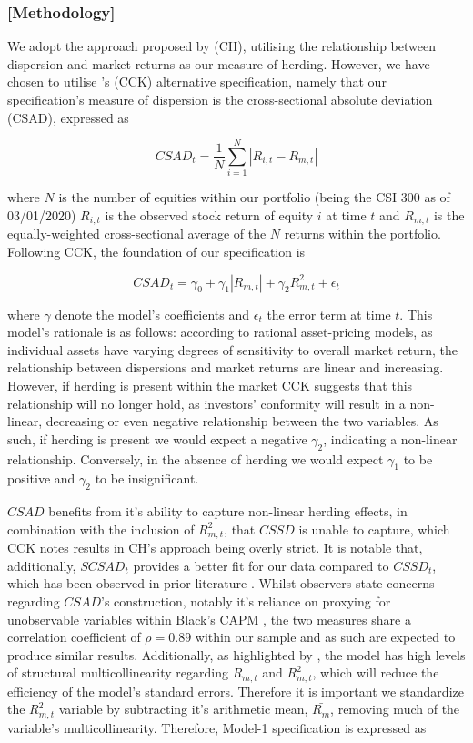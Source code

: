\documentclass[12pt]{article}
\numberwithin{table}{section}   %
\begin{document}
\subsubsection*{[Methodology]}

We adopt the approach proposed by \citet{ch} (CH), utilising the relationship between dispersion and market returns as our measure of herding. However, we have chosen to utilise \citet{cck}'s (CCK) alternative specification, namely that our specification’s measure of dispersion is the cross-sectional absolute deviation (CSAD), expressed as

$$
CSAD_t=\frac{1}{N}\sum^N_{i=1}|R_{i,t}-R_{m,t}|
$$

where $N$ is the number of equities within our portfolio (being the CSI 300 as of 03/01/2020) $R_{i,t}$ is the observed stock return of equity $i$ at time $t$ and $R_{m,t}$ is the equally-weighted cross-sectional average of the $N$ returns within the portfolio. Following CCK, the foundation of our specification is

$$
CSAD_t=\gamma_0+\gamma_1 |R_{m,t}|+\gamma_2 R_{m,t}^2+\epsilon_t
$$

where $\gamma$ denote the model’s coefficients and $\epsilon_t$ the error term at time $t$. This model’s rationale is as follows: according to rational asset-pricing models, as individual assets have varying degrees of sensitivity to overall market return, the relationship between dispersions and market returns are linear and increasing. However, if herding is present within the market CCK suggests that this relationship will no longer hold, as investors’ conformity will result in a non-linear, decreasing or even negative relationship between the two variables. As such, if herding is present we would expect a negative $\gamma_2$, indicating a non-linear relationship. Conversely, in the absence of herding we would expect $\gamma_1$ to be positive and $\gamma_2$ to be insignificant.

$CSAD$ benefits from it’s ability to capture non-linear herding effects, in combination with the inclusion of $R_{m,t}^2$, that $CSSD$ is unable to capture, which CCK notes results in CH’s approach being overly strict. It is notable that, additionally, $SCSAD_t$ provides a better fit for our data compared to $CSSD_t$, which has been observed in prior literature \citep{gleason}. Whilst observers state concerns regarding $CSAD$’s construction, notably it’s reliance on proxying for unobservable variables within Black’s CAPM \citep{yao, tan}, the two measures share a correlation coefficient of $\rho=0.89$ within our sample and as such are expected to produce similar results. Additionally, as highlighted by \citet{yao}, the model has high levels of structural multicollinearity regarding $R_{m,t}$ and $R_{m,t}^2$, which will reduce the efficiency of the model's standard errors. Therefore it is important we standardize the $R_{m,t}^2$ variable by subtracting it's arithmetic mean, $\bar{R_m}$, removing much of the variable's multicollinearity. Therefore, Model-1 specification is expressed as
\end{document}
